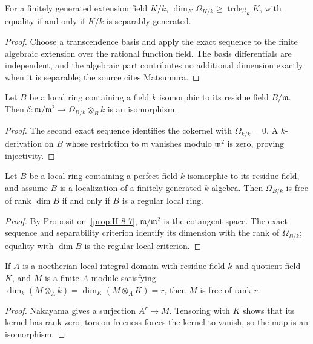\begin{theorem}
\label{thm:II-8-6A}
For a finitely generated extension field $K/k$, $\dim_K\Omega_{K/k}\ge\operatorname{trdeg}_kK$, with
equality if and only if $K/k$ is separably generated.
\end{theorem}
\begin{proof}
Choose a transcendence basis and apply the exact sequence to the finite algebraic extension over the
rational function field.  The basis differentials are independent, and the algebraic part contributes
no additional dimension exactly when it is separable; the source cites Matsumura.
\end{proof}

\begin{proposition}
\label{prop:II-8-7}
Let $B$ be a local ring containing a field $k$ isomorphic to its residue field $B/\mathfrak m$.  Then
$\delta:\mathfrak m/\mathfrak m^2\to\Omega_{B/k}\otimes_Bk$ is an isomorphism.
\end{proposition}
\begin{proof}
The second exact sequence identifies the cokernel with $\Omega_{k/k}=0$.  A $k$-derivation on $B$
whose restriction to $\mathfrak m$ vanishes modulo $\mathfrak m^2$ is zero, proving injectivity.
\end{proof}

\begin{theorem}
\label{thm:II-8-8}
Let $B$ be a local ring containing a perfect field $k$ isomorphic to its residue field, and assume
$B$ is a localization of a finitely generated $k$-algebra.  Then $\Omega_{B/k}$ is free of rank
$\dim B$ if and only if $B$ is a regular local ring.
\end{theorem}
\begin{proof}
By Proposition~\ref{prop:II-8-7}, $\mathfrak m/\mathfrak m^2$ is the cotangent space.  The exact
sequence and separability criterion identify its dimension with the rank of $\Omega_{B/k}$; equality
with $\dim B$ is the regular-local criterion.
\end{proof}

\begin{lemma}
\label{lem:II-8-9}
If $A$ is a noetherian local integral domain with residue field $k$ and quotient field $K$, and $M$ is
a finite $A$-module satisfying $\dim_k(M\otimes_Ak)=\dim_K(M\otimes_AK)=r$, then $M$ is free of rank $r$.
\end{lemma}
\begin{proof}
Nakayama gives a surjection $A^r\to M$.  Tensoring with $K$ shows that its kernel has rank zero;
torsion-freeness forces the kernel to vanish, so the map is an isomorphism.
\end{proof}

